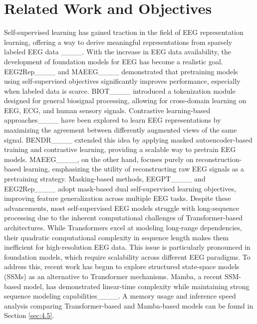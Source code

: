 \section{Related Work and Objectives }
Self-supervised learning has gained traction in the field of EEG representation learning, offering a way to derive meaningful representations from sparsely labeled EEG data ____. With the increase in EEG data availability, the development of foundation models for EEG has become a realistic goal. EEG2Rep____ and MAEEG____ demonstrated that pretraining models using self-supervised objectives significantly improves performance, especially when labeled data is scarce. BIOT____ introduced a tokenization module designed for general biosignal processing, allowing for cross-domain learning on EEG, ECG, and human sensory signals. Contrastive learning-based approaches____ have been explored to learn EEG representations by maximizing the agreement between differently augmented views of the same signal. BENDR____ extended this idea by applying masked autoencoder-based training and contrastive learning, providing a scalable way to pretrain EEG models. MAEEG____, on the other hand, focuses purely on reconstruction-based learning, emphasizing the utility of reconstructing raw EEG signals as a pretraining strategy. Masking-based methods, EEGPT____ and EEG2Rep____ adopt mask-based dual self-supervised learning objectives, improving feature generalization across multiple EEG tasks.  Despite these advancements, most self-supervised EEG models struggle with long-sequence processing due to the inherent computational challenges of Transformer-based architectures. While Transformers excel at modeling long-range dependencies, their quadratic computational complexity in sequence length makes them inefficient for high-resolution EEG data. This issue is particularly pronounced in foundation models, which require scalability across different EEG paradigms. To address this, recent work has begun to explore structured state-space models (SSMs) as an alternative to Transformer mechanisms. Mamba, a recent SSM-based model, has demonstrated linear-time complexity while maintaining strong sequence modeling capabilities____. A memory usage and inference speed analysis comparing Transformer-based and Mamba-based models can be found in Section \ref{sec:4.5}.

